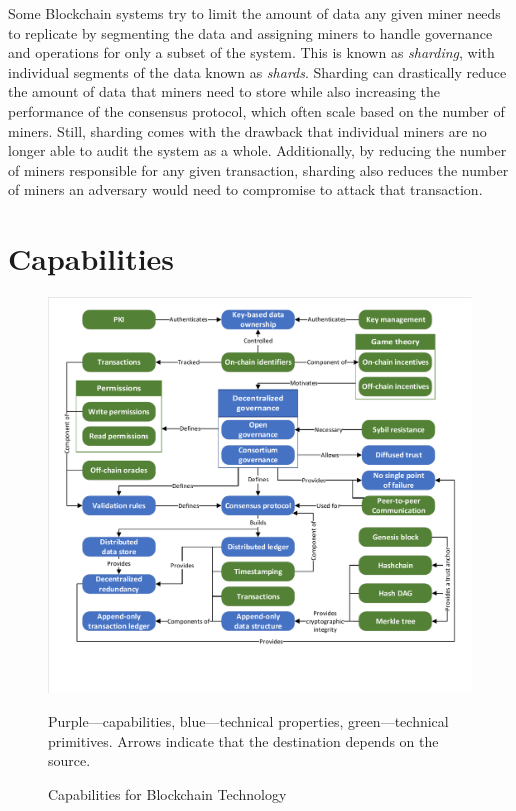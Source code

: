 Some Blockchain systems try to limit the amount of data any given miner needs to replicate by segmenting the data and assigning miners to handle governance and operations for only a subset of the system.
This is known as \emph{sharding}, with individual segments of the data known as \emph{shards}.
Sharding can drastically reduce the amount of data that miners need to store while also increasing the performance of the consensus protocol, which often scale based on the number of miners.
Still, sharding comes with the drawback that individual miners are no longer 
able to audit the system as a whole.
Additionally, by reducing the number of miners responsible for any given transaction, sharding also reduces the number of miners an adversary would need to compromise to attack that transaction.

\section{Capabilities}
\label{sec:capabilities}

\begin{figure}
	\centering
	\includegraphics[page=4,width=\columnwidth]{figures/grounded-theory-main}
	
	{\small Purple---capabilities, blue---technical properties, green---technical primitives. Arrows indicate that the destination depends on the source.}
	\caption{Capabilities for Blockchain Technology}
	\label{fig:Capabilities}
\end{figure}

